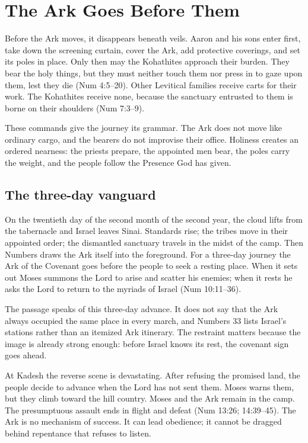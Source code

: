 \section{The Ark Goes Before Them}

Before the Ark moves, it disappears beneath veils.  Aaron and his sons enter
first, take down the screening curtain, cover the Ark, add protective coverings,
and set its poles in place.  Only then may the Kohathites approach their burden.
They bear the holy things, but they must neither touch them nor press in to gaze
upon them, lest they die (Num 4:5--20).  Other Levitical families receive carts
for their work.  The Kohathites receive none, because the sanctuary entrusted
to them is borne on their shoulders (Num 7:3--9).

These commands give the journey its grammar.  The Ark does not move like
ordinary cargo, and the bearers do not improvise their office.  Holiness creates
an ordered nearness: the priests prepare, the appointed men bear, the poles
carry the weight, and the people follow the Presence God has given.

\subsection{The three-day vanguard}

On the twentieth day of the second month of the second year, the cloud lifts
from the tabernacle and Israel leaves Sinai.  Standards rise; the tribes move in
their appointed order; the dismantled sanctuary travels in the midst of the
camp.  Then Numbers draws the Ark itself into the foreground.  For a three-day
journey the Ark of the Covenant goes before the people to seek a resting place.
When it sets out Moses summons the Lord to arise and scatter his enemies; when
it rests he asks the Lord to return to the myriads of Israel
(Num 10:11--36).

The passage speaks of this three-day advance.  It does not say that the Ark
always occupied the same place in every march, and Numbers 33 lists Israel's
stations rather than an itemized Ark itinerary.  The restraint matters because
the image is already strong enough: before Israel knows its rest, the covenant
sign goes ahead.

At Kadesh the reverse scene is devastating.  After refusing the promised land,
the people decide to advance when the Lord has not sent them.  Moses warns
them, but they climb toward the hill country.  Moses and the Ark remain in the
camp.  The presumptuous assault ends in flight and defeat (Num 13:26;
14:39--45).  The Ark is no mechanism of success.  It can lead obedience; it
cannot be dragged behind repentance that refuses to listen.

